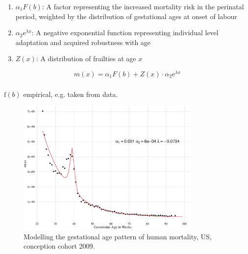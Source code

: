 \documentclass{beamer}
\begin{document}
\begin{frame}
\frametitle{\insertsection}

\begin{enumerate}
\item $\alpha_1 F(b)$: A factor representing the increased mortality risk in the perinatal period, weighted by the distribution of gestational ages at onset of labour
\item $\alpha_2 \text{e}^{\lambda x}$: A negative exponential function representing individual level adaptation and acquired robustness with age
\item $Z(x)$: A distribution of frailties at age $x$
\end{enumerate}

$$
m(x) = \alpha_1 F(b) + Z(x) \cdot \alpha_2 \text{e}^{\lambda x}
$$

\end{frame}

\begin{frame}
\frametitle{\insertsection}

$\text{f}(b)$ empirical, e.g. taken from data.

\begin{figure}[htb!]
\includegraphics[width = 0.8\textwidth]{./fig/fimort_mx_model1.pdf} \\
Modelling the gestational age pattern of human mortality, US, conception cohort 2009.
\end{figure}

\end{frame}
\end{document}
